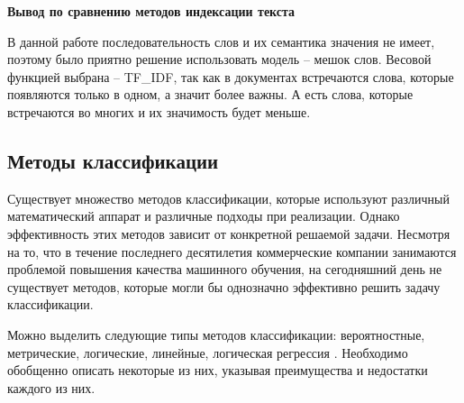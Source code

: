 \textbf{Вывод по сравнению методов индексации текста}

В данной работе последовательность слов и их семантика значения не имеет, поэтому было приятно решение использовать модель -- мешок слов. Весовой функцией выбрана -- TF\_IDF, так как в документах встречаются слова, которые появляются только в одном, а значит более важны. А есть слова, которые встречаются во многих и их значимость будет меньше.

\subsection{Методы классификации}

Существует множество методов классификации, которые используют различный математический аппарат и различные подходы при реализации. Однако эффективность этих методов зависит от конкретной решаемой задачи. Несмотря на то, что в течение последнего десятилетия коммерческие компании занимаются проблемой повышения качества машинного обучения, на сегодняшний день не существует методов, которые могли бы однозначно эффективно решить задачу классификации. 

Можно выделить следующие типы методов классификации: вероятностные, метрические, логические, линейные, логическая регрессия \cite{classes}. Необходимо обобщенно описать некоторые из них, указывая преимущества и недостатки каждого из них. 

